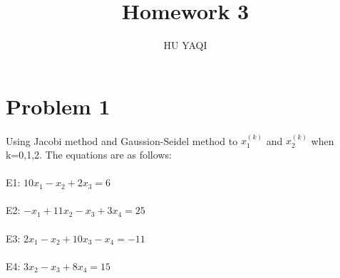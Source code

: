 \documentclass{article}
\title{ Homework 3 }
\author{HU YAQI}
\begin{document}
\maketitle
\setlength{\parindent}{0pt}

\section{ Problem 1 }
Using Jacobi method and Gaussion-Seidel method to $x_1^{(k)}$ and $x_2^{(k)}$ when k=0,1,2. The equations are as follows:\\
\\
E1:\; $10x_1-x_2+2x_3=6$\\
\\
E2:\; $-x_1+11x_2-x_3+3x_4=25$\\
\\
E3:\; $2x_1-x_2+10x_3-x_4=-11$\\
\\
E4:\; $3x_2-x_3+8x_4=15$\\
\end{document}
